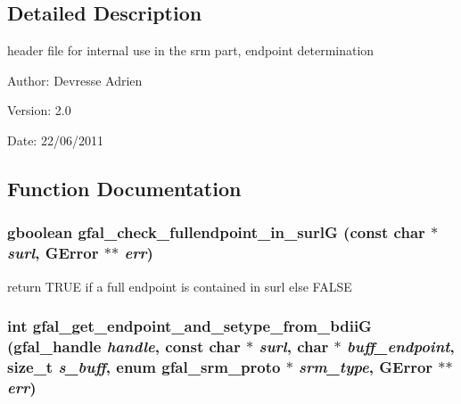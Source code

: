 \subsection{Detailed Description}
header file for internal use in the srm part, endpoint determination 

\begin{Desc}
\item[Author:]Devresse Adrien \end{Desc}
\begin{Desc}
\item[Version:]2.0 \end{Desc}
\begin{Desc}
\item[Date:]22/06/2011 \end{Desc}


\subsection{Function Documentation}
\subsubsection{\setlength{\rightskip}{0pt plus 5cm}gboolean gfal\_\-check\_\-fullendpoint\_\-in\_\-surl\-G (const char $\ast$ {\em surl}, GError $\ast$$\ast$ {\em err})}\label{gfal__common__srm__endpoint_8h_99a6995d5d222d54f28d7952499f60ba}


return TRUE if a full endpoint is contained in surl else FALSE 
\subsubsection{\setlength{\rightskip}{0pt plus 5cm}int gfal\_\-get\_\-endpoint\_\-and\_\-setype\_\-from\_\-bdii\-G (gfal\_\-handle {\em handle}, const char $\ast$ {\em surl}, char $\ast$ {\em buff\_\-endpoint}, size\_\-t {\em s\_\-buff}, enum gfal\_\-srm\_\-proto $\ast$ {\em srm\_\-type}, GError $\ast$$\ast$ {\em err})}\label{gfal__common__srm__endpoint_8h_140721fdb18fe72533ed6f47122e939d}


